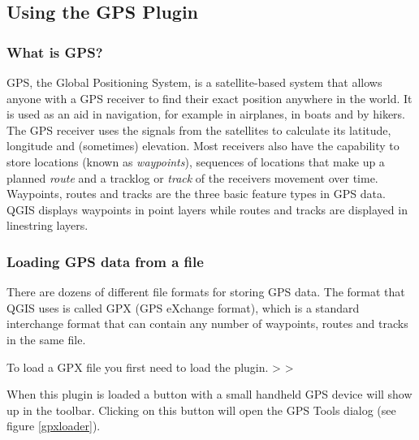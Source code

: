 \subsection{Using the GPS Plugin}\label{label_plugingps}

\subsubsection{What is GPS?}\label{whatsgps}

GPS, the Global Positioning System, is a satellite-based system that allows anyone with a GPS receiver to find their exact position anywhere in the world.
It is used as an aid in navigation, for example in airplanes, in boats and by hikers.
The GPS receiver uses the signals from the satellites to calculate its latitude, longitude and (sometimes) elevation.
Most receivers also have the capability to store locations (known as \emph{waypoints}), sequences of locations that make up a planned \emph{route} and a tracklog or \emph{track} of the receivers movement over time.
Waypoints, routes and tracks are the three basic feature types in GPS data.
QGIS displays waypoints in point layers while routes and tracks are displayed in linestring layers.

\subsubsection{Loading GPS data from a file}\label{label_loadgps}

There are dozens of different file formats for storing GPS data.
The format that QGIS uses is called GPX (GPS eXchange format), which is a standard interchange format that can contain any number of waypoints, routes and tracks in the same file.

To load a GPX file you first need to load the plugin.
 >  > 

When this plugin is loaded a button with a small handheld GPS device will show up in the toolbar.
Clicking on this button  will open the GPS Tools dialog (see figure \ref{gpxloader}).


